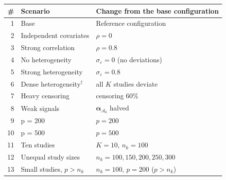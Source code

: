 \begin{tabular}{@{}rll@{}}
\toprule
\# & Scenario & Change from the base configuration \\
\midrule
1 & Base & Reference configuration \\
2 & Independent covariates & $\rho=0$ \\
3 & Strong correlation & $\rho=0.8$ \\
4 & No heterogeneity & $\sigma_\varepsilon=0$ (no deviations) \\
5 & Strong heterogeneity & $\sigma_\varepsilon=0.8$ \\
6 & Dense heterogeneity$^{\dagger}$ & all $K$ studies deviate \\
7 & Heavy censoring & censoring $60\%$ \\
8 & Weak signals & $\boldsymbol\alpha_{\mathcal A_0}$ halved \\
9 & p = 200 & $p=200$ \\
10 & p = 500 & $p=500$ \\
11 & Ten studies & $K=10$, $n_k=100$ \\
12 & Unequal study sizes & $n_k=100,150,200,250,300$ \\
13 & Small studies, $p>n_k$ & $n_k=100$, $p=200$ ($p>n_k$) \\
\bottomrule
\end{tabular}
